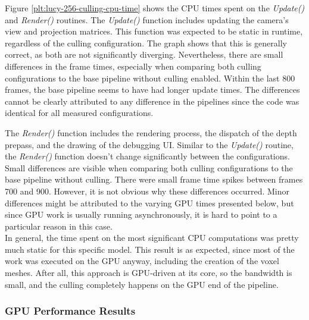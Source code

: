 \noindent
Figure \ref{plt:lucy-256-culling-cpu-time} shows the \ac{CPU} times spent on the \emph{Update()} and \emph{Render()}
routines. The \emph{Update()} function includes updating the camera's view and projection matrices. This function was 
expected to be static in runtime, regardless of the culling configuration. The graph shows that this is generally 
correct, as both are not significantly diverging. Nevertheless, there are small differences in the frame times, 
especially when comparing both culling configurations to the base pipeline without culling enabled. Within the last 
800 frames, the base pipeline seems to have had longer update times. The differences cannot be clearly attributed to 
any difference in the pipelines since the code was identical for all measured configurations. \\
\enlargethispage{\baselineskip}

\noindent
The \emph{Render()} function includes the rendering process, the dispatch of the depth prepass, and the drawing of the 
debugging \ac{UI}. Similar to the \emph{Update()} routine, the \emph{Render()} function doesn't change significantly 
between the configurations. Small differences are visible when comparing both culling configurations to the base 
pipeline without culling. There were small frame time spikes between frames 700 and 900. However, it is not obvious 
why these differences occurred. Minor differences might be attributed to the varying \ac{GPU} times presented below, 
but since \ac{GPU} work is usually running asynchronously, it is hard to point to a particular reason in this case. \\

\noindent
In general, the time spent on the most significant \ac{CPU} computations was pretty much static for this specific 
model. This result is as expected, since most of the work was executed on the \ac{GPU} anyway, including the creation 
of the voxel meshes. After all, this approach is \ac{GPU}-driven at its core, so the bandwidth is small, and the culling 
completely happens on the \ac{GPU} end of the pipeline.

\subsubsection*{GPU Performance Results} \label{subsubsec-gpu-performance-results-lucy}

\enlargethispage{\baselineskip}
\enlargethispage{\baselineskip}
\enlargethispage{\baselineskip}
\enlargethispage{\baselineskip}

